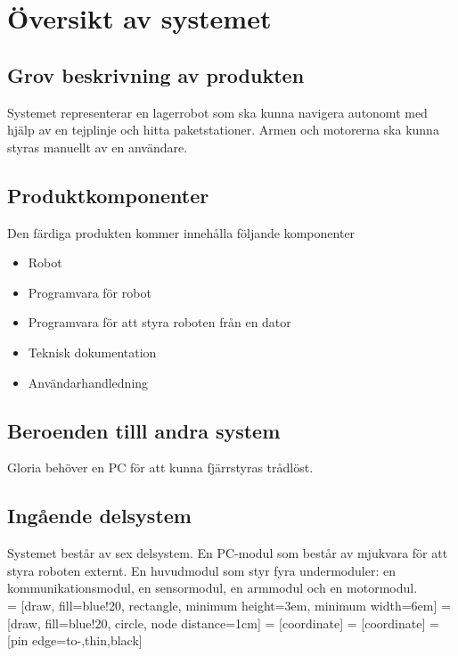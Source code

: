 \section{Översikt av systemet}

\subsection{Grov beskrivning av produkten}
Systemet representerar en lagerrobot som ska kunna navigera autonomt med hjälp av en tejplinje och hitta paketstationer. Armen och motorerna ska kunna styras manuellt av en användare.

\subsection{Produktkomponenter}
Den färdiga produkten kommer innehålla följande komponenter
\begin{itemize}
\item{Robot}
\item{Programvara för robot}
\item{Programvara för att styra roboten från en dator}
\item{Teknisk dokumentation}
\item{Användarhandledning}
\end{itemize}

\subsection{Beroenden tilll andra system}
Gloria behöver en PC för att kunna fjärrstyras trådlöst.

\subsection{Ingående delsystem}
Systemet består av sex delsystem. En PC-modul som består av mjukvara för att styra roboten externt. En huvudmodul som styr fyra undermoduler: en kommunikationsmodul, en sensormodul, en armmodul och en motormodul. \\

 = [draw, fill=blue!20, rectangle, 
    minimum height=3em, minimum width=6em]
 = [draw, fill=blue!20, circle, node distance=1cm]
 = [coordinate]
 = [coordinate]
 = [pin edge={to-,thin,black}]


